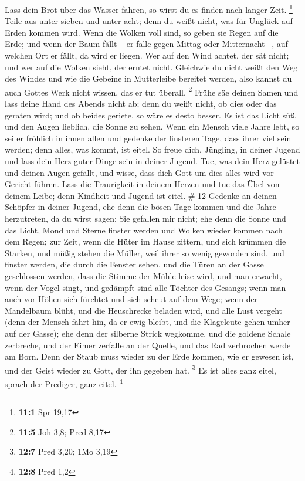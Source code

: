  Lass dein Brot über das Wasser fahren, so wirst du es
finden nach langer Zeit. \footnote{\textbf{11:1} Spr 19,17} 
Teile aus unter sieben und unter acht; denn du weißt nicht, was für
Unglück auf Erden kommen wird.  Wenn die Wolken voll sind,
so geben sie Regen auf die Erde; und wenn der Baum fällt -- er falle
gegen Mittag oder Mitternacht --, auf welchen Ort er fällt, da wird er
liegen.  Wer auf den Wind achtet, der sät nicht; und wer auf
die Wolken sieht, der erntet nicht.  Gleichwie du nicht
weißt den Weg des Windes und wie die Gebeine in Mutterleibe bereitet
werden, also kannst du auch Gottes Werk nicht wissen, das er tut
überall. \footnote{\textbf{11:5} Joh 3,8; Pred 8,17}  Frühe
säe deinen Samen und lass deine Hand des Abends nicht ab; denn du weißt
nicht, ob dies oder das geraten wird; und ob beides geriete, so wäre es
desto besser.  Es ist das Licht süß, und den Augen lieblich,
die Sonne zu sehen.  Wenn ein Mensch viele Jahre lebt, so
sei er fröhlich in ihnen allen und gedenke der finsteren Tage, dass
ihrer viel sein werden; denn alles, was kommt, ist eitel. 
So freue dich, Jüngling, in deiner Jugend und lass dein Herz guter Dinge
sein in deiner Jugend. Tue, was dein Herz gelüstet und deinen Augen
gefällt, und wisse, dass dich Gott um dies alles wird vor Gericht
führen.  Lass die Traurigkeit in deinem Herzen und tue das
Übel von deinem Leibe; denn Kindheit und Jugend ist eitel. \# 12
 Gedenke an deinen Schöpfer in deiner Jugend, ehe denn die
bösen Tage kommen und die Jahre herzutreten, da du wirst sagen: Sie
gefallen mir nicht;  ehe denn die Sonne und das Licht, Mond
und Sterne finster werden und Wolken wieder kommen nach dem Regen;
 zur Zeit, wenn die Hüter im Hause zittern, und sich krümmen
die Starken, und müßig stehen die Müller, weil ihrer so wenig geworden
sind, und finster werden, die durch die Fenster sehen,  und
die Türen an der Gasse geschlossen werden, dass die Stimme der Mühle
leise wird, und man erwacht, wenn der Vogel singt, und gedämpft sind
alle Töchter des Gesangs;  wenn man auch vor Höhen sich
fürchtet und sich scheut auf dem Wege; wenn der Mandelbaum blüht, und
die Heuschrecke beladen wird, und alle Lust vergeht (denn der Mensch
fährt hin, da er ewig bleibt, und die Klageleute gehen umher auf der
Gasse);  ehe denn der silberne Strick wegkomme, und die
goldene Schale zerbreche, und der Eimer zerfalle an der Quelle, und das
Rad zerbrochen werde am Born.  Denn der Staub muss wieder zu
der Erde kommen, wie er gewesen ist, und der Geist wieder zu Gott, der
ihn gegeben hat. \footnote{\textbf{12:7} Pred 3,20; 1Mo 3,19}
 Es ist alles ganz eitel, sprach der Prediger, ganz eitel.
\footnote{\textbf{12:8} Pred 1,2}

